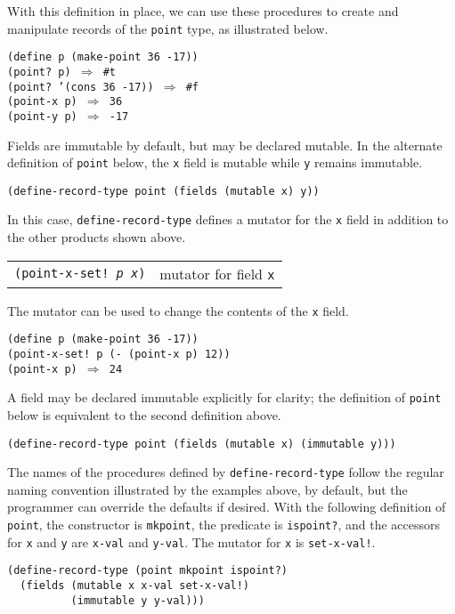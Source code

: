 With this definition in place, we can use these procedures to create
and manipulate records of the \texttt{point} type, as illustrated below.


\begin{alltt}
(define p (make-point 36 -17))
(point? p) \(\Rightarrow\) \#{}t
(point? '(cons 36 -17)) \(\Rightarrow\) \#{}f
(point-x p) \(\Rightarrow\) 36
(point-y p) \(\Rightarrow\) -17
\end{alltt}


Fields are immutable by default, but may be declared mutable.
In the alternate definition of \texttt{point} below, the \texttt{x}
field is mutable while \texttt{y} remains immutable.


\texttt{(define-record-type point (fields (mutable x) y))}

In this case, \texttt{define-record-type} defines a mutator for
the \texttt{x} field in addition to the other products shown
above.


{\footnotesize
\begin{tabular}[H]{ll}

\texttt{(point-x-set! \textit{p} \textit{x})}  &  mutator for field \texttt{x}
 \\
\end{tabular}
}



The mutator can be used to change the contents of the \texttt{x} field.


\begin{alltt}
(define p (make-point 36 -17))
(point-x-set! p (- (point-x p) 12))
(point-x p) \(\Rightarrow\) 24
\end{alltt}


A field may be declared immutable explicitly for clarity; the definition of
\texttt{point} below is equivalent to the second definition 
above.


\texttt{(define-record-type point (fields (mutable x) (immutable y)))}

The names of the procedures defined by \texttt{define-record-type} follow
the regular naming convention illustrated by the examples above, by
default, but the programmer can override the defaults if desired.
With the following definition of \texttt{point}, the constructor is
\texttt{mkpoint}, the predicate is \texttt{ispoint?}, and the accessors
for \texttt{x} and \texttt{y} are \texttt{x-val} and \texttt{y-val}.
The mutator for \texttt{x} is \texttt{set-x-val!}.


\begin{alltt}
(define-record-type (point mkpoint ispoint?)
  (fields (mutable x x-val set-x-val!)
          (immutable y y-val)))
\end{alltt}


